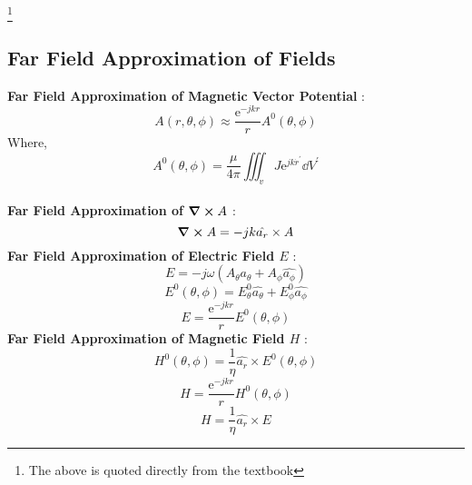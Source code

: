 \documentclass[class=article, crop=false]{standalone}
\begin{document}
    \footnote{
        The above is quoted directly from the textbook\cite{BALANIS}
    }

    \subsection{Far Field Approximation of Fields}
    \textbf{
        Far Field Approximation of Magnetic Vector Potential
    }: \begin{equation}
           A(r, \theta ,\phi) \approx \frac{\mathrm{e}^{-jkr}}{r} A^{0}(\theta, \phi)
    \end{equation} Where,
    \begin{equation}
        A^{0}(\theta, \phi) = \frac{\mu}{4 \pi} \iiint_v J \mathrm{e}^{j k \dot r^\prime } \dd V^\prime
    \end{equation} \\
    \textbf{
        Far Field Approximation of $\curl A$
    }: \begin{equation}
           \curl A = - j k \hat{a_r} \times A
    \end{equation}
    \textbf{
        Far Field Approximation of Electric Field $E$
    }: \begin{equation}
           E = -j \omega ( A_\theta \hat{a_\theta} + A_\phi \hat{a_\phi} )
    \end{equation}
    \begin{equation}
        E^0(\theta, \phi) = E^0_\theta \hat{a_\theta} + E^0_\phi \hat{a_\phi}
    \end{equation}
    \begin{equation}
        E =  \frac{\mathrm{e}^{-jkr}}{r} E^0(\theta, \phi)
    \end{equation}
    \textbf{
        Far Field Approximation of Magnetic Field $H$
    }: \begin{equation}
           H^0(\theta, \phi) = \frac{1}{\eta} \hat{a_r} \times E^0(\theta, \phi)
    \end{equation}
    \begin{equation}
        H = \frac{\mathrm{e}^{-jkr}}{r} H^0(\theta, \phi)
    \end{equation}
    \begin{equation}
        H = \frac{1}{\eta} \hat{a_r} \times E
    \end{equation}
\end{document}
